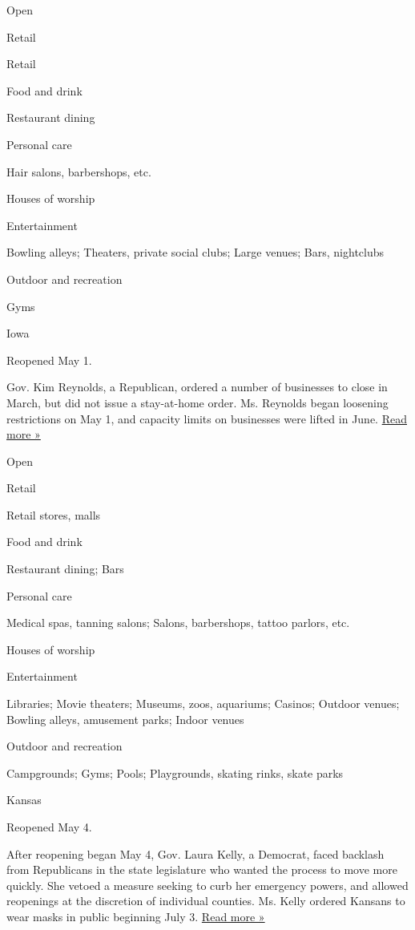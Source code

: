 Open

Retail

Retail

Food and drink

Restaurant dining

Personal care

Hair salons, barbershops, etc.

Houses of worship

Entertainment

Bowling alleys; Theaters, private social clubs; Large venues; Bars,
nightclubs

Outdoor and recreation

Gyms

Iowa

Reopened May 1.

Gov. Kim Reynolds, a Republican, ordered a number of businesses to close
in March, but did not issue a stay-at-home order. Ms. Reynolds began
loosening restrictions on May 1, and capacity limits on businesses were
lifted in June.
\href{https://ktiv.com/2020/06/10/watch-live-gov-reynolds-hold-news-conference-on-covid-19/}{Read
more »}

Open

Retail

Retail stores, malls

Food and drink

Restaurant dining; Bars

Personal care

Medical spas, tanning salons; Salons, barbershops, tattoo parlors, etc.

Houses of worship

Entertainment

Libraries; Movie theaters; Museums, zoos, aquariums; Casinos; Outdoor
venues; Bowling alleys, amusement parks; Indoor venues

Outdoor and recreation

Campgrounds; Gyms; Pools; Playgrounds, skating rinks, skate parks

Kansas

Reopened May 4.

After reopening began May 4, Gov. Laura Kelly, a Democrat, faced
backlash from Republicans in the state legislature who wanted the
process to move more quickly. She vetoed a measure seeking to curb her
emergency powers, and allowed reopenings at the discretion of individual
counties. Ms. Kelly ordered Kansans to wear masks in public beginning
July 3.
\href{https://www.kansas.com/news/politics-government/article244554662.html}{Read
more »}

